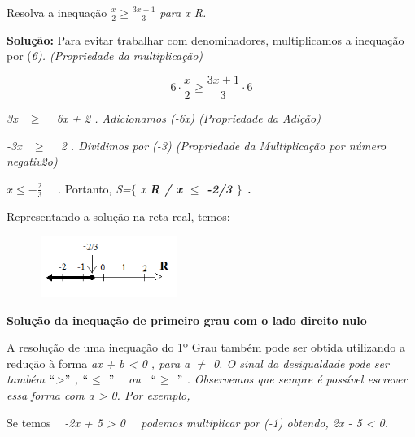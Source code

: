 \begin{texemplo}
Resolva a inequação   \( \frac{x}{2} \geq \frac{3x+1}{3} \) \textit{ para x  R.}

\textbf{Solução:} Para evitar trabalhar com denominadores, multiplicamos a inequação por (\textit{6). (Propriedade da multiplicação)}

 \[  \]  \[ 6 \cdot \frac{x}{2} \geq \frac{3x+1}{3} \cdot 6 \] 

\textit{3x~ $ \geq $ ~ 6x + 2 . Adicionamos (-6x) (Propriedade da Adição)}

\textit{-3x~ $ \geq $ ~ 2 . Dividimos por (-3) (Propriedade da Multiplicação por número negativ2o)}

 \( x  \leq  -\frac{2}{3} \) ~~.  Portanto, \textit{S=$ \{ $ x  \textbf{R / x $ \leq $  -2/3 $ \} $ . }}

Representando a solução na reta real, temos:

\begin{figure}[H]
	\centering
	\includegraphics[width=1.79in,height=0.79in]{capitulos/inequacoes/media/image3.png}\qedsymbol{}
\end{figure}

\end{texemplo}

\textbf{Solução da inequação de primeiro grau com o lado direito nulo }

A resolução de uma inequação do 1º Grau também pode ser obtida utilizando a redução à forma \textit{ax + b < 0 , para a $ \neq $  0. O sinal da desigualdade pode ser também $``$>$"$ , $``$$ \leq $ $"$ ~ ou ~$``$$ \geq $ $"$  .  Observemos que sempre é possível escrever essa forma com a > 0. Por exemplo, }

Se temos  \textit{~ -2x + 5 > 0~~ podemos multiplicar por (-1) obtendo, 2x - 5 < 0.~~ }

